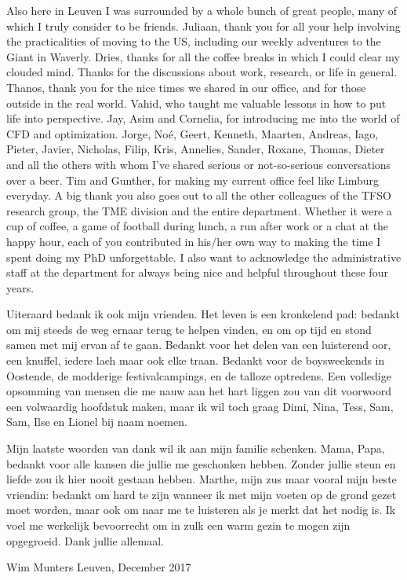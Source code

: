 Also here in Leuven I was surrounded by a whole bunch of great people, many of which I truly consider to be friends. Juliaan, thank you for all your help involving the practicalities of moving to the US, including our weekly adventures to the Giant in Waverly. Dries, thanks for all the coffee breaks in which I could clear my clouded mind. Thanks for the discussions about work, research, or life in general. Thanos, thank you for the nice times we shared in our office, and for those outside in the real world. Vahid, who taught me valuable lessons in how to put life into perspective. Jay, Asim and Cornelia, for introducing me into the world of CFD and optimization. Jorge, No\'e, Geert, Kenneth, Maarten, Andreas, Iago, Pieter, Javier, Nicholas, Filip, Kris, Annelies, Sander, Roxane, Thomas, Dieter and all the others with whom I've shared serious or not-so-serious conversations over a beer. Tim and Gunther, for making my current office feel like Limburg everyday. A big thank you also goes out to all the other colleagues of the TFSO research group, the TME division and the entire department. Whether it were a cup of coffee, a game of football during lunch, a run after work or a chat at the happy hour, each of you contributed in his/her own way to making the time I spent doing my PhD unforgettable. I also want to acknowledge the administrative staff at the department for always being nice and helpful throughout these four years. 

Uiteraard bedank ik ook mijn vrienden. Het leven is een kronkelend pad: bedankt om mij steeds de weg ernaar terug te helpen vinden, en om op tijd en stond samen met mij ervan af te gaan. Bedankt voor het delen van een luisterend oor, een knuffel, iedere lach maar ook elke traan. Bedankt voor de boysweekends in Oostende, de modderige festivalcampings, en de talloze optredens. Een volledige opsomming van mensen die me nauw aan het hart liggen zou van dit voorwoord een volwaardig hoofdstuk maken, maar ik wil toch graag Dimi, Nina, Tess, Sam, Sam, Ilse en Lionel bij naam noemen.

Mijn laatste woorden van dank wil ik aan mijn familie schenken. Mama, Papa, bedankt voor alle kansen die jullie me geschonken hebben. Zonder jullie steun en liefde zou ik hier nooit gestaan hebben. Marthe, mijn zus maar vooral mijn beste vriendin: bedankt om hard te zijn wanneer ik met mijn voeten op de grond gezet moet worden, maar ook om naar me te luisteren als je merkt dat het nodig is. Ik voel me werkelijk bevoorrecht om in zulk een warm gezin te mogen zijn opgegroeid. Dank jullie allemaal.

Wim Munters \hfill Leuven, December 2017

\cleardoublepage


